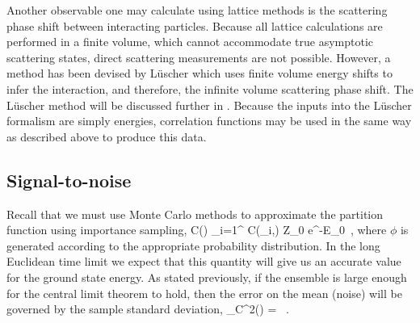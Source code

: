 Another observable one may calculate using lattice methods is the scattering phase shift between interacting particles. Because all lattice calculations are performed in a finite volume, which cannot accommodate true asymptotic scattering states, direct scattering measurements are not possible. However, a method has been devised by L\"uscher which uses finite volume energy shifts to infer the interaction, and therefore, the infinite volume scattering phase shift. The L\"uscher method will be discussed further in . Because the inputs into the L\"uscher formalism are simply energies, correlation functions may be used in the same way as described above to produce this data.

\subsection{\label{sec:SNR}Signal-to-noise}
Recall that we must use Monte Carlo methods to approximate the partition function using importance sampling,
\beq
C(\tau) \approx {} \sum_{i=1}^{\Ncfg} C(\phi_i,\tau) \tautoinfty Z_0 e^{-E_0\tau}\ ,
\eeq
where $\phi$ is generated according to the appropriate probability distribution. In the long Euclidean time limit we expect that this quantity will give us an accurate value for the ground state energy. As stated previously, if the ensemble is large enough for the central limit theorem to hold, then the error on the mean (noise) will be governed by the sample standard deviation,
\beq
\sigma_C^2(\tau) = \left[ \sum_{i=1}^{\Ncfg}|C(\phi_i,\tau)|^2 - \left|\sum_{i=1}^{\Ncfg}C(\phi_i,\tau)\right|^2\right] \ .
\eeq

